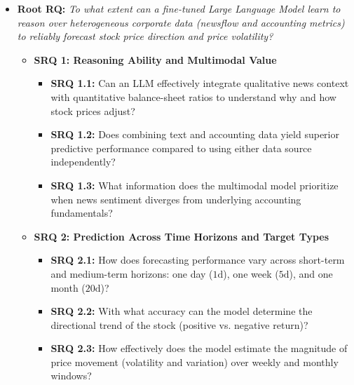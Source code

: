 \documentclass[11pt,a4paper]{article}
\begin{document}
\begin{itemize}[leftmargin=*, label=$\mathbf{\blacktriangleright}$]
    \item \textbf{Root RQ:} \textit{To what extent can a fine-tuned Large Language Model learn to reason over heterogeneous corporate data (newsflow and accounting metrics) to reliably forecast stock price direction and price volatility?}
    
    \begin{itemize}[leftmargin=*, label=$\mathbf{\triangleright}$]
        \item \textbf{SRQ 1: Reasoning Ability and Multimodal Value}
        \begin{itemize}[label=$\circ$]
            \item \textbf{SRQ 1.1:} Can an LLM effectively integrate qualitative news context with quantitative balance-sheet ratios to understand why and how stock prices adjust?
            \item \textbf{SRQ 1.2:} Does combining text and accounting data yield superior predictive performance compared to using either data source independently?
            \item \textbf{SRQ 1.3:} What information does the multimodal model prioritize when news sentiment diverges from underlying accounting fundamentals?
        \end{itemize}

        \item \textbf{SRQ 2: Prediction Across Time Horizons and Target Types}
        \begin{itemize}[label=$\circ$]
            \item \textbf{SRQ 2.1:} How does forecasting performance vary across short-term and medium-term horizons: one day ($1\text{d}$), one week ($5\text{d}$), and one month ($20\text{d}$)?
            \item \textbf{SRQ 2.2:} With what accuracy can the model determine the directional trend of the stock (positive vs. negative return)?
            \item \textbf{SRQ 2.3:} How effectively does the model estimate the magnitude of price movement (volatility and variation) over weekly and monthly windows?
        \end{itemize}


\end{itemize}
\end{itemize}
\end{document}
